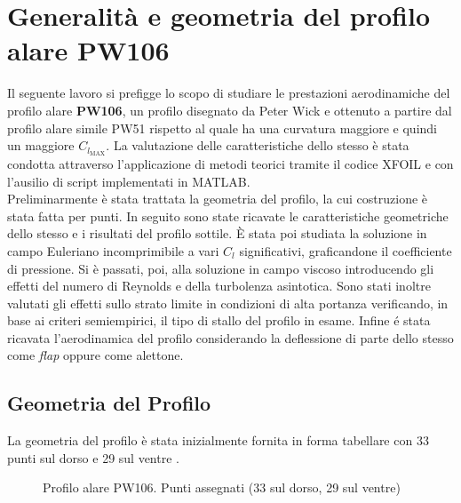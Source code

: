 \chapter{Generalità e geometria del profilo alare PW106}

Il seguente lavoro si prefigge lo scopo di studiare le prestazioni aerodinamiche del profilo alare {\bfseries PW106}, un profilo disegnato da Peter Wick e ottenuto a partire dal profilo alare simile PW51 rispetto al quale ha una curvatura maggiore e quindi un maggiore $C_{l_\mathrm{MAX}}$. 
La valutazione delle caratteristiche dello stesso è stata condotta attraverso l'applicazione di metodi teorici tramite il codice XFOIL e con l'ausilio di script implementati in MATLAB.
\\
Preliminarmente è stata trattata la geometria del profilo, la cui costruzione è stata fatta per punti. In seguito sono state ricavate le caratteristiche geometriche dello stesso e i risultati del profilo sottile. È stata poi studiata la soluzione in campo Euleriano incomprimibile a vari $C_l$ significativi, graficandone il coefficiente di pressione. Si è passati, poi, alla soluzione in campo viscoso introducendo gli effetti del numero di Reynolds e della turbolenza asintotica. Sono stati inoltre valutati gli effetti sullo strato limite in condizioni di alta portanza verificando, in base ai criteri semiempirici, il tipo di stallo del profilo in esame. Infine é stata ricavata l'aerodinamica del profilo considerando la deflessione di parte dello stesso come {\itshape flap} oppure come alettone.

\section{Geometria del Profilo}

La geometria del profilo è stata inizialmente fornita in forma tabellare con 33 punti sul dorso e 29 sul ventre \cite{prof:sito}. \\ 



\begin{figure} [h!]
\centering
{}
\caption{\footnotesize Profilo alare PW106. Punti assegnati (33 sul dorso, 29 sul ventre) }\label{fig:cp}
\end{figure}
\noindent
 \\ 


